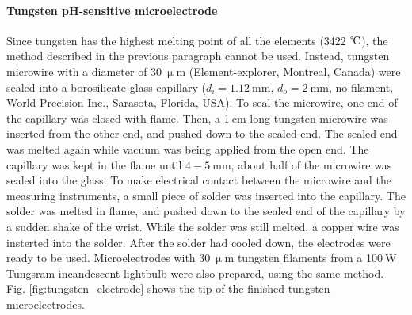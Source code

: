 \paragraph{Tungsten pH-sensitive microelectrode}
Since tungsten has the highest melting point of all the elements (3422 $\celsius$), the method described in the previous paragraph cannot be used.
Instead, tungsten microwire with a diameter of $30~\upmu$m (Element-explorer, Montreal, Canada) were sealed into a borosilicate glass capillary ($d_i=1.12~$mm, $d_o=2~$mm, no filament, World Precision Inc., Sarasota, Florida, USA).
To seal the microwire, one end of the capillary was closed with flame.
Then, a 1$~$cm long tungsten microwire was inserted from the other end, and pushed down to the sealed end.
The sealed end was melted again while vacuum was being applied from the open end.
The capillary was kept in the flame until $4-5~$mm, about half of the microwire was sealed into the glass.
To make electrical contact between the microwire and the measuring instruments, a small piece of solder was inserted into the capillary.
The solder was melted in flame, and pushed down to the sealed end of the capillary by a sudden shake of the wrist.
While the solder was still melted, a copper wire was insterted into the solder.
After the solder had cooled down, the electrodes were ready to be used.
Microelectrodes with $30~\upmu$m tungsten filaments from a 100$~$W Tungsram incandescent lightbulb were also prepared, using the same method.
Fig. \ref{fig:tungsten_electrode} shows the tip of the finished tungsten microelectrodes.

